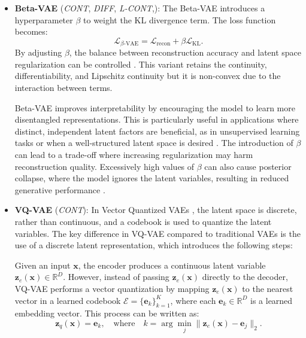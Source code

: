 \documentclass[sn-mathphys-num]{sn-jnl}%
\newcommand \cont{\textit{CONT}}
\newcommand \lcont{\textit{L-CONT}}
\newcommand \diff{\textit{DIFF}}
\begin{document}
\begin{itemize}
    \item \textbf{Beta-VAE} (\cont, \diff, \lcont,): The Beta-VAE \cite{higgins2017beta} introduces a hyperparameter $\beta$ to weight the KL divergence term. The loss function becomes:
    \begin{equation}
        \mathcal{L}_{\beta\text{-VAE}} = \mathcal{L}_{\text{recon}} + \beta \mathcal{L}_{\text{KL}}.
    \end{equation}
    By adjusting $\beta$, the balance between reconstruction accuracy and latent space regularization can be controlled \cite{burgess2018understanding}. This variant retains the continuity, differentiability, and Lipschitz continuity but it is non-convex due to the interaction between terms.


    Beta-VAE improves interpretability by encouraging the model to learn more disentangled representations. This is particularly useful in applications where distinct, independent latent factors are beneficial, as in unsupervised learning tasks or when a well-structured latent space is desired \cite{higgins2017beta}. The introduction of $\beta$ can lead to a trade-off where increasing regularization may harm reconstruction quality. Excessively high values of $\beta$ can also cause posterior collapse, where the model ignores the latent variables, resulting in reduced generative performance \cite{alemi2018fixing,bowman2015generating,burgess2018understanding}.

    \item \textbf{VQ-VAE} (\cont): In Vector Quantized VAEs \cite{van2017neural}, the latent space is discrete, rather than continuous, and a codebook is used to quantize the latent variables. The key difference in VQ-VAE compared to traditional VAEs is the use of a discrete latent representation, which introduces the following steps:

Given an input $\mathbf{x}$, the encoder produces a continuous latent variable $\mathbf{z}_e(\mathbf{x}) \in \mathbb{R}^D$. However, instead of passing $\mathbf{z}_e(\mathbf{x})$ directly to the decoder, VQ-VAE performs a vector quantization by mapping $\mathbf{z}_e(\mathbf{x})$ to the nearest vector in a learned codebook $\mathcal{E} = \{\mathbf{e}_k\}_{k=1}^K$, where each $\mathbf{e}_k \in \mathbb{R}^D$ is a learned embedding vector. This process can be written as:
\begin{equation}
    \mathbf{z}_q(\mathbf{x}) = \mathbf{e}_k, \quad \text{where} \quad k = \arg \min_j \|\mathbf{z}_e(\mathbf{x}) - \mathbf{e}_j\|_2.
\end{equation}


\end{itemize}
\end{document}
